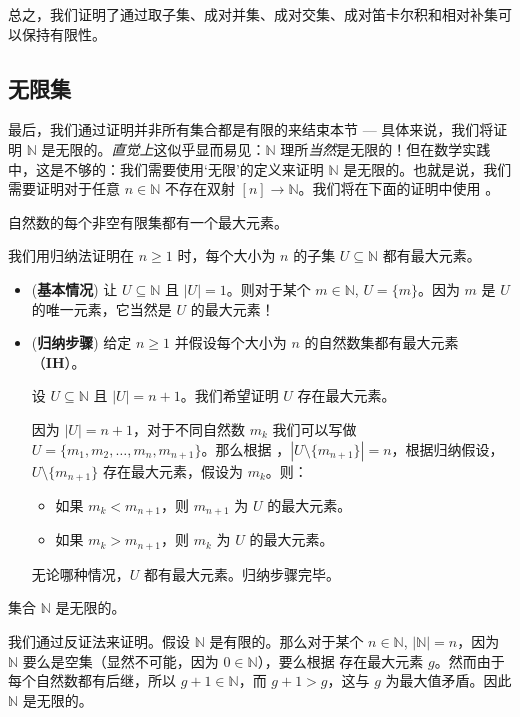 总之，我们证明了通过取子集、成对并集、成对交集、成对笛卡尔积和相对补集可以保持有限性。
\subsection*{无限集}

最后，我们通过证明并非所有集合都是有限的来结束本节 --- 具体来说，我们将证明 $\mathbb{N}$ 是无限的。\textit{直觉上}这似乎显而易见：$\mathbb{N}$ 理所\textit{当然}是无限的！但在数学实践中，这是不够的：我们需要使用`无限'的定义来证明 $\mathbb{N}$ 是无限的。也就是说，我们需要证明对于任意 $n \in \mathbb{N}$ 不存在双射 $[n] \to \mathbb{N}$。我们将在下面的证明中使用 。

\begin{lemma}
\label{lemFinSetGreatestElement}
自然数的每个非空有限集都有一个最大元素。
\end{lemma}
\begin{cproof}
我们用归纳法证明在 $n \ge 1$ 时，每个大小为 $n$ 的子集 $U \subseteq \mathbb{N}$ 都有最大元素。
\begin{itemize}
\item (\textbf{基本情况}) 让 $U \subseteq \mathbb{N}$ 且 $|U|=1$。则对于某个  $m \in \mathbb{N}$, $U = \{ m \}$。因为 $m$ 是 $U$ 的唯一元素，它当然是 $U$ 的最大元素！

\item (\textbf{归纳步骤}) 给定 $n \ge 1$ 并假设每个大小为 $n$ 的自然数集都有最大元素（\textbf{IH}）。

设 $U \subseteq \mathbb{N}$ 且 $|U| = n+1$。我们希望证明 $U$ 存在最大元素。

因为 $|U| = n+1$，对于不同自然数 $m_k$ 我们可以写做 $U = \{ m_1, m_2, \dots, m_n, m_{n+1} \}$。那么根据 ，$|U \setminus \{ m_{n+1} \}| = n$，根据归纳假设，$U \setminus \{ m_{n+1} \}$ 存在最大元素，假设为 $m_k$。则：
\begin{itemize}
\item 如果 $m_k < m_{n+1}$，则 $m_{n+1}$ 为 $U$ 的最大元素。
\item 如果 $m_k > m_{n+1}$，则 $m_k$ 为 $U$ 的最大元素。
\end{itemize}
无论哪种情况，$U$ 都有最大元素。归纳步骤完毕。
\end{itemize}
\end{cproof}

\begin{theorem}
\label{thmNIsInfinite}
集合 $\mathbb{N}$ 是无限的。
\end{theorem}

\begin{cproof}
我们通过反证法来证明。假设 $\mathbb{N}$ 是有限的。那么对于某个 $n \in \mathbb{N}$, $|\mathbb{N}| = n$，因为 $\mathbb{N}$ 要么是空集（显然不可能，因为 $0 \in \mathbb{N}$），要么根据  存在最大元素 $g$。然而由于每个自然数都有后继，所以 $g+1 \in \mathbb{N}$，而 $g+1 > g$，这与 $g$ 为最大值矛盾。因此 $\mathbb{N}$ 是无限的。
\end{cproof}
